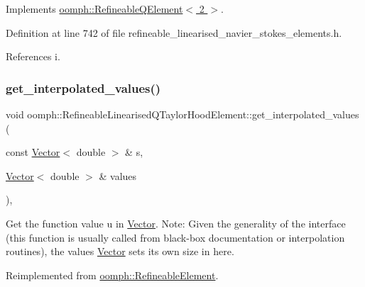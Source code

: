 Implements \hyperlink{classoomph_1_1RefineableQElement_3_012_01_4_a01e1eb063dd2c98ebb42d87959ca6b88}{oomph\+::\+Refineable\+Q\+Element$<$ 2 $>$}.



Definition at line 742 of file refineable\+\_\+linearised\+\_\+navier\+\_\+stokes\+\_\+elements.\+h.



References i.

\mbox{\label{classoomph_1_1RefineableLinearisedQTaylorHoodElement_a8c4ef6c32ff8a6ebec168bacf151ed6a}} 
\subsubsection{\texorpdfstring{get\+\_\+interpolated\+\_\+values()}{get\_interpolated\_values()}\hspace{0.1cm}{\footnotesize\ttfamily [1/2]}}
{\footnotesize\ttfamily void oomph\+::\+Refineable\+Linearised\+Q\+Taylor\+Hood\+Element\+::get\+\_\+interpolated\+\_\+values (\begin{DoxyParamCaption}\item[{const \hyperlink{classoomph_1_1Vector}{Vector}$<$ double $>$ \&}]{s,  }\item[{\hyperlink{classoomph_1_1Vector}{Vector}$<$ double $>$ \&}]{values }\end{DoxyParamCaption})\hspace{0.3cm}{\ttfamily [inline]}, {\ttfamily [virtual]}}



Get the function value u in \hyperlink{classoomph_1_1Vector}{Vector}. Note\+: Given the generality of the interface (this function is usually called from black-\/box documentation or interpolation routines), the values \hyperlink{classoomph_1_1Vector}{Vector} sets its own size in here. 



Reimplemented from \hyperlink{classoomph_1_1RefineableElement_ad9a4f92880668a2373326d8306365c43}{oomph\+::\+Refineable\+Element}.




